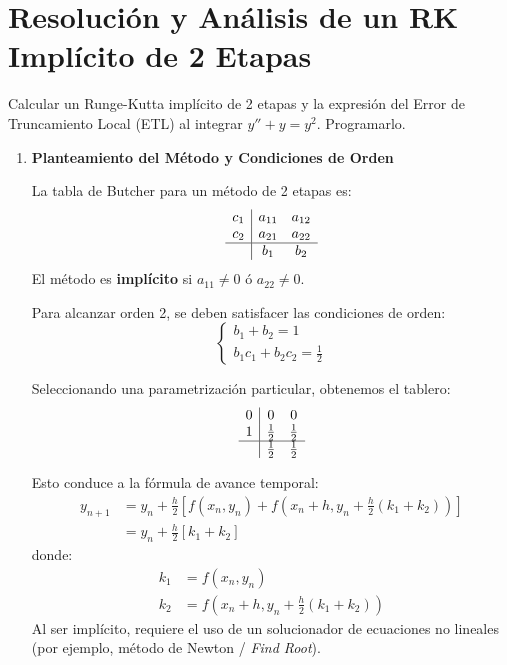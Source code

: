 \section*{Resolución y Análisis de un RK Implícito de 2 Etapas}
\begin{ejer} Calcular un Runge-Kutta implícito de 2 etapas y la expresión del Error de Truncamiento Local (ETL) al integrar $y'' + y = y^2$. Programarlo.
\end{ejer}
\begin{sol}
\begin{enumerate}
\item \textbf{Planteamiento del Método y Condiciones de Orden}

La tabla de Butcher para un método de 2 etapas es:
\[
\begin{array}{c|cc}
c_1 & a_{11} & a_{12} \\
c_2 & a_{21} & a_{22} \\
\hline
    & b_1    & b_2
\end{array}
\]
El método es \textbf{implícito} si $a_{11} \neq 0$ \'o $a_{22} \neq 0$. 

Para alcanzar orden 2, se deben satisfacer las condiciones de orden:
\[
\begin{cases}
b_1 + b_2 = 1 \\
b_1 c_1 + b_2 c_2 = \frac{1}{2}
\end{cases}
\]

Seleccionando una parametrización particular, obtenemos el tablero:
\[
\begin{array}{c|cc}
0   & 0   & 0   \\
1   & \frac{1}{2} & \frac{1}{2} \\
\hline
    & \frac{1}{2} & \frac{1}{2}
\end{array}
\]

Esto conduce a la fórmula de avance temporal:
\begin{align*}
y_{n+1} &= y_n + \frac{h}{2} \left[ f\left(x_n, y_n\right) + f\left(x_n + h, y_n + \frac{h}{2}(k_1 + k_2)\right) \right] \\
&= y_n + \frac{h}{2} [k_1 + k_2]
\end{align*}
donde:
\begin{align*}
k_1 &= f(x_n, y_n) \\
k_2 &= f\left(x_n + h, y_n + \frac{h}{2}(k_1 + k_2)\right)
\end{align*}
Al ser implícito, requiere el uso de un solucionador de ecuaciones no lineales (por ejemplo, método de Newton / \textit{Find Root}).


\end{enumerate}
\end{sol}

